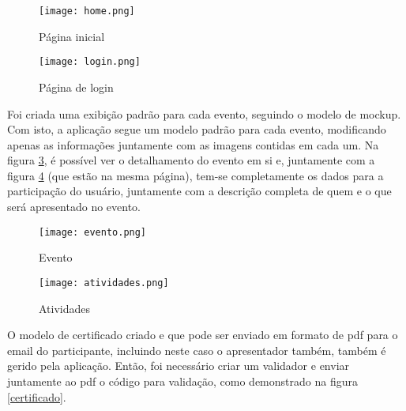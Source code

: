 \begin{figure}[H]
    \caption{\label{home}Página inicial}
    \vspace{5pt}
    \centering
    \texttt{[image: home.png]}
    \vspace{5pt}
\end{figure}
\begin{figure}[H]
    \caption{\label{login}Página de login}
    \vspace{5pt}
    \centering
    \texttt{[image: login.png]}
    \vspace{5pt}
\end{figure}
Foi criada uma exibição padrão para cada evento, seguindo o modelo de mockup. Com isto, a aplicação segue um modelo padrão para cada evento, modificando apenas as informações juntamente com as imagens contidas em cada um. Na figura \ref{evento}, é possível ver o detalhamento do evento em si e, juntamente com a figura \ref{atividades} (que estão na mesma página), tem-se completamente os dados para a participação do usuário, juntamente com a descrição completa de quem e o que será apresentado no evento. \\
\begin{figure}[H]
    \caption{\label{evento}Evento}
    \vspace{5pt}
    \centering
    \texttt{[image: evento.png]}
    \vspace{5pt}
\end{figure}
\begin{figure}[H]
    \caption{\label{atividades}Atividades}
    \vspace{5pt}
    \centering
    \texttt{[image: atividades.png]}
    \vspace{5pt}
\end{figure}
O modelo de certificado criado e que pode ser enviado em formato de pdf para o email do participante, incluindo neste caso o apresentador também, também é gerido pela aplicação. Então, foi necessário criar um validador e enviar juntamente ao pdf o código para validação, como demonstrado na figura \ref{certificado}.

